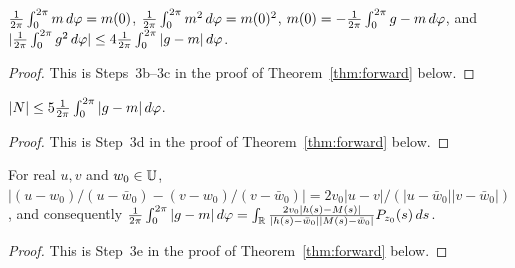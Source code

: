 \begin{lemma}\label{lem:circleAvg_sq_le_four}
	$\frac{1}{2\pi}\int_0^{2\pi} m \,d\varphi=m(0)$, $\frac{1}{2\pi}\int_0^{2\pi} m^2 \,d\varphi=m(0)^2$, $m(0)=-\frac{1}{2\pi}\int_0^{2\pi} g-m \,d\varphi$, and $|\frac{1}{2\pi}\int_0^{2\pi} g^2 \,d\varphi|\le4\frac{1}{2\pi}\int_0^{2\pi} |g-m| \,d\varphi$.
\end{lemma}
\begin{proof}
	This is Steps~3b--3c in the proof of Theorem~\ref{thm:forward} below.
\end{proof}

\begin{lemma}\label{lem:muNumerator_le}
	$|N|\le5\frac{1}{2\pi}\int_0^{2\pi} |g-m| \,d\varphi$.
\end{lemma}
\begin{proof}
	This is Step~3d in the proof of Theorem~\ref{thm:forward} below.
\end{proof}

\begin{lemma}\label{lem:circleAvgReal_transfer}
	For real $u,v$ and $w_0\in\mathbb{U}$, $|(u-w_0)/(u-\bar w_0)-(v-w_0)/(v-\bar w_0)|=2v_0|u-v|/(|u-\bar w_0||v-\bar w_0|)$, and consequently $\frac{1}{2\pi}\int_0^{2\pi} |g-m| \,d\varphi=\int_{\mathbb{R}}\frac{2v_0|h(s)-M(s)|}{|h(s)-\bar w_0||M(s)-\bar w_0|}P_{z_0}(s)\,ds$.
\end{lemma}
\begin{proof}
	This is Step~3e in the proof of Theorem~\ref{thm:forward} below.
\end{proof}

